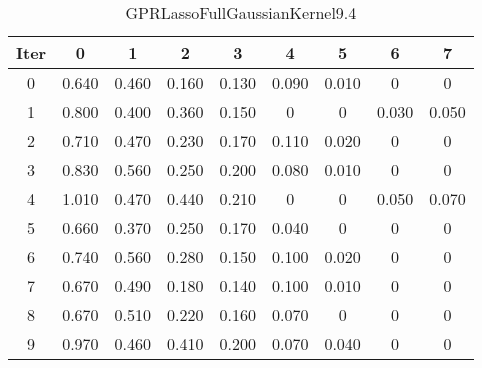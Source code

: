 \begin{table}
	\begin{center}
		\begin{tabular}{|c|c|c|c|c|c|c|c|c|}
			\hline
			Iter & 0 & 1 & 2 & 3 & 4 & 5 & 6 & 7 \\
			\hline
			0 & 0.640 & 0.460 & 0.160 & 0.130 & 0.090 & 0.010 & 0 & 0 \\
			\hline
			1 & 0.800 & 0.400 & 0.360 & 0.150 & 0 & 0 & 0.030 & 0.050 \\
			\hline
			2 & 0.710 & 0.470 & 0.230 & 0.170 & 0.110 & 0.020 & 0 & 0 \\
			\hline
			3 & 0.830 & 0.560 & 0.250 & 0.200 & 0.080 & 0.010 & 0 & 0 \\
			\hline
			4 & 1.010 & 0.470 & 0.440 & 0.210 & 0 & 0 & 0.050 & 0.070 \\
			\hline
			5 & 0.660 & 0.370 & 0.250 & 0.170 & 0.040 & 0 & 0 & 0 \\
			\hline
			6 & 0.740 & 0.560 & 0.280 & 0.150 & 0.100 & 0.020 & 0 & 0 \\
			\hline
			7 & 0.670 & 0.490 & 0.180 & 0.140 & 0.100 & 0.010 & 0 & 0 \\
			\hline
			8 & 0.670 & 0.510 & 0.220 & 0.160 & 0.070 & 0 & 0 & 0 \\
			\hline
			9 & 0.970 & 0.460 & 0.410 & 0.200 & 0.070 & 0.040 & 0 & 0 \\
			\hline
		\end{tabular}
	\end{center}
	\caption{GPRLassoFullGaussianKernel9.4}
\end{table}